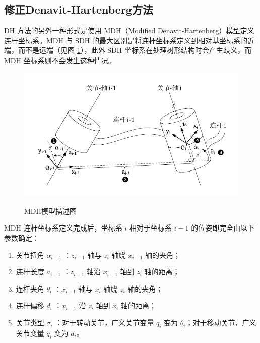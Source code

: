 \documentclass[cn,11pt,chinese,blue,bibstyle=ieeetr]{elegantbook}
\begin{document}
\subsection{修正Denavit-Hartenberg方法}

DH 方法的另外一种形式是使用 MDH（Modified Denavit-Hartenberg）模型定义连杆坐标系。MDH 与 SDH 的最大区别是将连杆坐标系定义到相对基坐标系的近端，而不是远端（见图 \ref{mdh_model_description}），此外 SDH 坐标系在处理树形结构时会产生歧义，而 MDH 坐标系则不会发生这种情况。

\begin{figure}[htbp]
	\centering
	\includegraphics[scale=1]{images//mdh_model.pdf} \\
	\caption{MDH模型描述图}
	\label{mdh_model_description}
\end{figure}

MDH 连杆坐标系定义完成后，坐标系 $i$ 相对于坐标系 $i-1$ 的位姿即完全由以下参数确定：
\begin{enumerate}
	\item 关节扭角 $\alpha_{i-1}$ ：$z_{i-1}$ 轴与 $z_i$ 轴绕 $x_{i-1}$ 轴的夹角；
	\item 连杆长度 $a_{i-1}$ ：$z_{i-1}$ 轴沿 $x_{i-1}$ 轴到 $z_i$ 轴的距离；
	\item 连杆夹角 $\theta_{i}$ ：$x_{i-1}$ 轴与 $x_i$ 轴绕 $z_{i}$ 轴的夹角；
	\item 连杆偏移 $d_{i}$ ：$x_{i-1}$ 沿 $z_{i}$ 轴到 $x_i$ 轴的距离；
	\item 关节类型 $\sigma_i$ ：对于转动关节，广义关节变量 $q_i$ 变为 $\theta_{i}$；对于移动关节，广义关节变量 $q_i$ 变为 $d_i$。
\end{enumerate}
\end{document}
